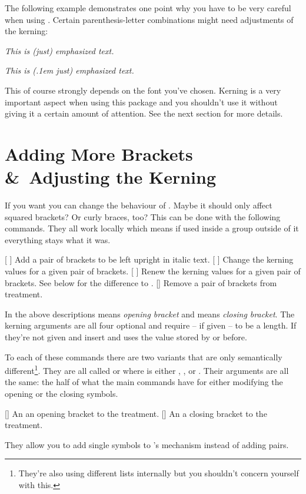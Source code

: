\documentclass[load-preamble+]{cnltx-doc}
\begin{document}
The following example demonstrates one point why you have to be very careful
when using \embrac.  Certain parenthesis-letter combinations might need
adjustments of the kerning:
\begin{example}
  \emph{This is (just) emphasized text.} \par
  \emph{This is (\kern.1em just) emphasized text.}
\end{example}
This of course strongly depends on the font you've chosen.  Kerning is a very
important aspect when using this package and you shouldn't use it without
giving it a certain amount of attention.  See the next section for more
details.

\section{Adding More Brackets \&\ Adjusting the Kerning}
If you want you can change the behaviour of \embrac.  Maybe it should only
affect squared brackets?  Or curly braces, too?  This can be done with the
following commands.  They all work locally which means if used inside a group
outside of it everything stays what it was.
\begin{commands}
  [%
    ]
    Add a pair of brackets to be left upright in italic text.
  [%
    ]
    Change the kerning values for a given pair of brackets.
  [%
    ]
    Renew the kerning values for a given pair of brackets.  See below for the
    difference to .
  []
    Remove a pair of brackets from treatment.
\end{commands}
In the above descriptions  means \emph{opening bracket} and 
means \emph{closing bracket}.  The kerning arguments are all four optional and
require -- if given -- to be a length.  If they're not given  and
 insert \code{0pt} and  uses the value stored by
 or  before.

To each of these commands there are two variants that are
only semantically different\footnote{They're also using different lists
  internally but you shouldn't concern yourself with this.}.  They are all
called  or  where  is
either , ,  or .  Their
arguments are all the same: the half of what the main commands have for either
modifying the opening or the closing symbols.
\begin{commands}
  []
    An an opening bracket to the treatment.
  []
    An a closing bracket to the treatment.
\end{commands}
They allow you to add single symbols to \embrac's mechanism instead of adding
pairs.
\end{document}
